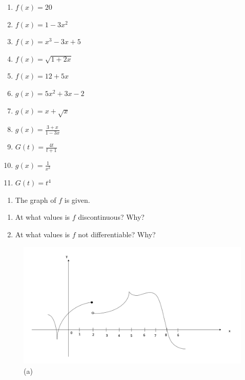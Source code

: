 \documentclass[]{book}
\providecommand{\tightlist}{%
  \setlength{\itemsep}{0pt}\setlength{\parskip}{0pt}}
\begin{document}
\begin{enumerate}
\def\labelenumi{(\alph{enumi})}
\tightlist
\item
  \(f(x) = 20\)
\item
  \(f(x) = 1-3x^2\)
\item
  \(f(x) = x^3 -3x+5\)
\item
  \(f(x) = \sqrt{1+2x}\)
\item
  \(f(x) = 12+5x\)
\item
  \(g(x) = 5x^2+3x-2\)
\item
  \(g(x) = x+\sqrt{x}\)
\item
  \(g(x) = \frac{3+x}{1-3x}\)
\item
  \(G(t) = \frac{4t}{t+1}\)
\item
  \(g(x) = \frac{1}{x^2}\)
\item
  \(G(t) = t^4\)
\end{enumerate}

\begin{enumerate}
\def\labelenumi{\arabic{enumi}.}
\setcounter{enumi}{2}
\tightlist
\item
  The graph of \(f\) is given.
\end{enumerate}

\begin{enumerate}
\def\labelenumi{(\roman{enumi})}
\tightlist
\item
  At what values is \(f\) discontinuous? Why?
\item
  At what values is \(f\) not differentiable? Why?
\end{enumerate}

\begin{figure}

{\centering \includegraphics[width=0.7\linewidth]{figure/5Derivatives-9} 

}

\caption{(a)}\label{fig:p1}
\end{figure}
\end{document}
